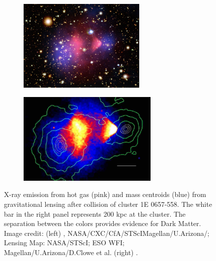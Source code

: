 \begin{figure}
    \centering
    \begin{subfigure}[t]{0.45\textwidth}
        \centering
        \includegraphics[height=4.5cm]{chandra_bullett_preview}
    \end{subfigure}%
    \begin{subfigure}[t]{0.45\textwidth}
        \centering
        \includegraphics[height=4.5cm]{bullet_cluster_paper}
    \end{subfigure}
    \caption[X-ray emission from hot gas (pink) and mass centroids (blue) from gravitational lensing after
	collision of cluster 1E 0657-558.]{X-ray emission from hot gas (pink) and mass centroids (blue) from gravitational
	lensing after
	collision of cluster 1E 0657-558.  The white bar in the right panel represents 200 kpc at the cluster.  The separation
	between the colors provides evidence for Dark Matter.
	Image credit: (left) , NASA/CXC/CfA/STScIMagellan/U.Arizona/;
	Lensing Map: NASA/STScI; ESO WFI; Magellan/U.Arizona/D.Clowe et al. (right) .}
	\label{fig:bullet_cluster}
\end{figure}

